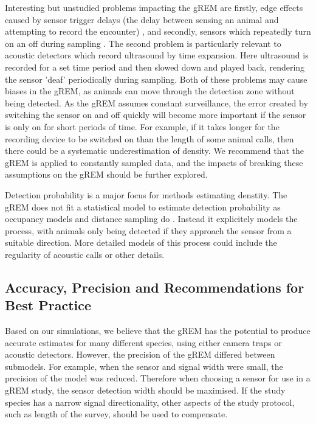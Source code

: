 \documentclass[a4paper,10pt,reqno,oneside]{amsart}
\begin{document}
Interesting but unstudied problems impacting the gREM are firstly, edge effects caused by sensor trigger delays (the delay between sensing an animal and attempting to record the encounter) \citep{rovero2013camera}, and secondly, sensors which repeatedly turn on an off during sampling \citep{jones2011indicator}. The second problem is particularly relevant to acoustic detectors which record ultrasound by time expansion. Here ultrasound is recorded for a set time period and then slowed down and played back, rendering the sensor 'deaf' periodically during sampling. Both of these problems may cause biases in the gREM, as animals can move through the detection zone without being detected. As the gREM assumes constant surveillance, the error created by switching the sensor on and off quickly will become more important if the sensor is only on for short periods of time. For example, if it takes longer for the recording device to be switched on than the length of some animal calls, then there could be a systematic underestimation of density. We recommend that the gREM is applied to constantly sampled data, and the impacts of breaking these assumptions on the gREM should be further explored. 

Detection probability is a major focus for methods estimating denstity. The gREM does not fit a statistical model to estimate detection probability as occupancy models and distance sampling do \citep{royle2003estimating, barlow2005estimates, marques2011estimating}. Instead it explicitely models the process, with animals only being detected if they approach the sensor from a suitable direction. More detailed models of this process could include the regularity of acoustic calls or other details. 

\subsection*{Accuracy, Precision and Recommendations for Best Practice}
Based on our simulations, we believe that the gREM has the potential to produce accurate estimates for many different species, using either camera traps or acoustic detectors. However, the precision of the gREM differed between submodels. For example, when the sensor and signal width were small, the precision of the model was reduced. Therefore when choosing a sensor for use in a gREM study, the sensor detection width should be maximised. If the study species has a narrow signal directionality, other aspects of the study protocol, such as length of the survey, should be used to compensate. 
\end{document}
